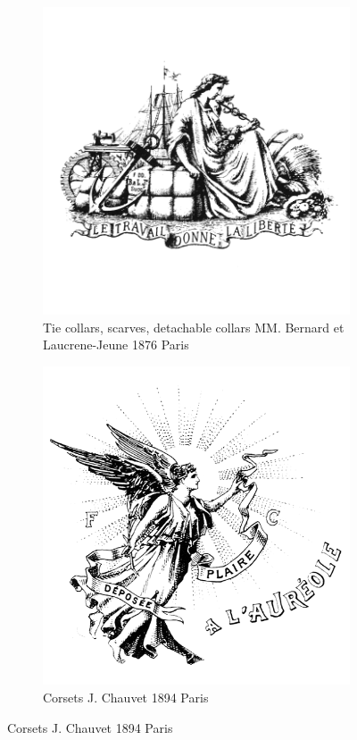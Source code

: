 \begin{figure}[h]
  \centering
  \begin{subfigure}{.45\textwidth}
    \centering
    \includegraphics[width=.5\linewidth]{images/supplement/trademarks/french/3_5}
    \caption[]{Tie collars, scarves, detachable collars MM. Bernard et Laucrene-Jeune 1876 Paris}
    \label{fig:trademarks:french:3.5}
  \end{subfigure}\hfill
  \begin{subfigure}{.45\textwidth}
    \centering
    \includegraphics[width=.5\linewidth]{images/supplement/trademarks/french/3_8}
    \caption[]{Corsets J. Chauvet 1894 Paris}
    \label{fig:trademarks:french:3.8}
  \end{subfigure}


\end{figure}
